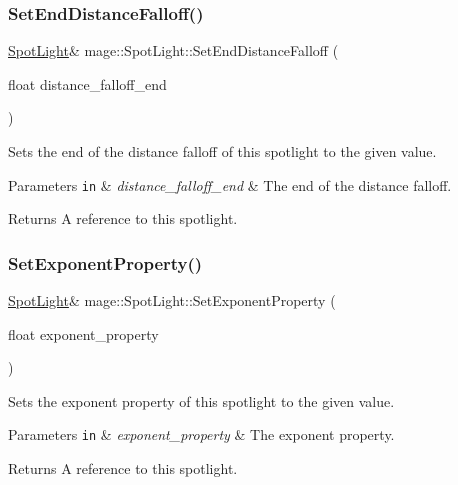 \subsubsection{\texorpdfstring{Set\+End\+Distance\+Falloff()}{SetEndDistanceFalloff()}}
{\footnotesize\ttfamily \hyperlink{classmage_1_1_spot_light}{Spot\+Light}\& mage\+::\+Spot\+Light\+::\+Set\+End\+Distance\+Falloff (\begin{DoxyParamCaption}\item[{float}]{distance\+\_\+falloff\+\_\+end }\end{DoxyParamCaption})}

Sets the end of the distance falloff of this spotlight to the given value.


\begin{DoxyParams}[1]{Parameters}
\mbox{\tt in}  & {\em distance\+\_\+falloff\+\_\+end} & The end of the distance falloff. \\
\hline
\end{DoxyParams}
\begin{DoxyReturn}{Returns}
A reference to this spotlight. 
\end{DoxyReturn}
\hypertarget{classmage_1_1_spot_light_a5a53acd29a7796a16459284dc24b9044}{}\label{classmage_1_1_spot_light_a5a53acd29a7796a16459284dc24b9044} 
\subsubsection{\texorpdfstring{Set\+Exponent\+Property()}{SetExponentProperty()}}
{\footnotesize\ttfamily \hyperlink{classmage_1_1_spot_light}{Spot\+Light}\& mage\+::\+Spot\+Light\+::\+Set\+Exponent\+Property (\begin{DoxyParamCaption}\item[{float}]{exponent\+\_\+property }\end{DoxyParamCaption})}

Sets the exponent property of this spotlight to the given value.


\begin{DoxyParams}[1]{Parameters}
\mbox{\tt in}  & {\em exponent\+\_\+property} & The exponent property. \\
\hline
\end{DoxyParams}
\begin{DoxyReturn}{Returns}
A reference to this spotlight. 
\end{DoxyReturn}
\hypertarget{classmage_1_1_spot_light_a47869866b30e98e9f6af59905d127cc9}{}\label{classmage_1_1_spot_light_a47869866b30e98e9f6af59905d127cc9} 
